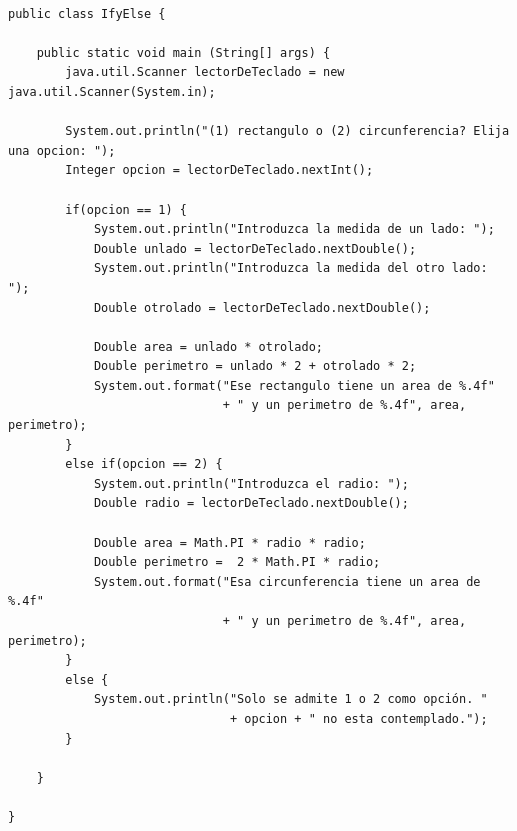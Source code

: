 \documentclass[spanish,12pt,a4paper,final,oneside]{book}
\begin{document}
\begin{lstlisting}[frame=single, caption=lenguaje java]

public class IfyElse {
	
    public static void main (String[] args) {
        java.util.Scanner lectorDeTeclado = new java.util.Scanner(System.in);
        
        System.out.println("(1) rectangulo o (2) circunferencia? Elija una opcion: ");
        Integer opcion = lectorDeTeclado.nextInt();

        if(opcion == 1) {
            System.out.println("Introduzca la medida de un lado: ");
            Double unlado = lectorDeTeclado.nextDouble();
            System.out.println("Introduzca la medida del otro lado: ");
            Double otrolado = lectorDeTeclado.nextDouble();   

            Double area = unlado * otrolado;
            Double perimetro = unlado * 2 + otrolado * 2;
            System.out.format("Ese rectangulo tiene un area de %.4f"
                              + " y un perimetro de %.4f", area, perimetro);
        }
        else if(opcion == 2) {
            System.out.println("Introduzca el radio: ");
            Double radio = lectorDeTeclado.nextDouble();

            Double area = Math.PI * radio * radio;
            Double perimetro =  2 * Math.PI * radio;
            System.out.format("Esa circunferencia tiene un area de %.4f"
                              + " y un perimetro de %.4f", area, perimetro);
        }
        else {
            System.out.println("Solo se admite 1 o 2 como opción. " 
                               + opcion + " no esta contemplado.");
        }
        
    }
    
}

\end{lstlisting}
\end{document}
